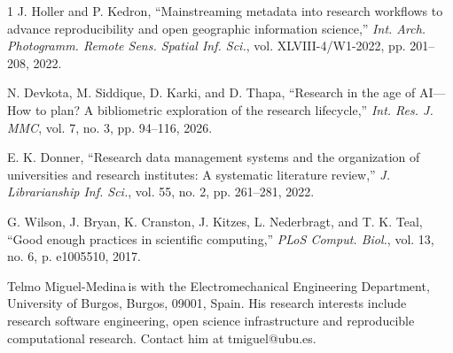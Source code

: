 \documentclass{IEEEcsmag}
\begin{document}
\begin{thebibliography}{1}
J. Holler and P. Kedron, ``Mainstreaming metadata into research workflows to advance reproducibility and open geographic information science,'' {\it Int. Arch. Photogramm. Remote Sens. Spatial Inf. Sci.}, vol. XLVIII-4/W1-2022, pp. 201--208, 2022.

N. Devkota, M. Siddique, D. Karki, and D. Thapa, ``Research in the age of AI---How to plan? A bibliometric exploration of the research lifecycle,'' {\it Int. Res. J. MMC}, vol. 7, no. 3, pp. 94--116, 2026.

E. K. Donner, ``Research data management systems and the organization of universities and research institutes: A systematic literature review,'' {\it J. Librarianship Inf. Sci.}, vol. 55, no. 2, pp. 261--281, 2022.

G. Wilson, J. Bryan, K. Cranston, J. Kitzes, L. Nederbragt, and T. K. Teal, ``Good enough practices in scientific computing,'' {\it PLoS Comput. Biol.}, vol. 13, no. 6, p. e1005510, 2017.

\end{thebibliography}

\begin{IEEEbiography}{Telmo Miguel-Medina}{\,}is with the Electromechanical Engineering Department, University of Burgos, Burgos, 09001, Spain. His research interests include research software engineering, open science infrastructure and reproducible computational research. Contact him at tmiguel@ubu.es.
\end{IEEEbiography}
\end{document}
